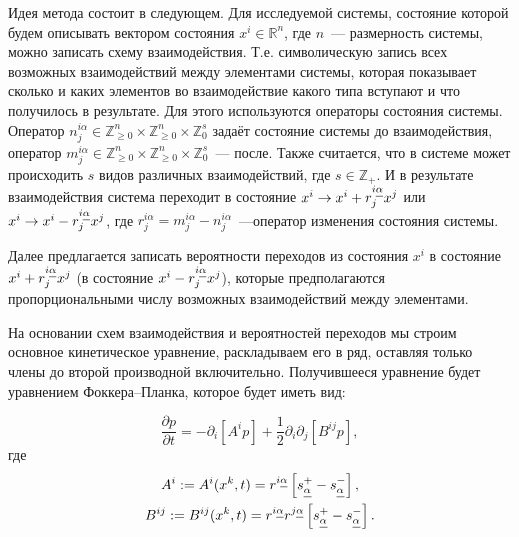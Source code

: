 \documentclass[floatfix,
showkeys,
twocolumn, nofootinbib, superscriptaddress, ]{revtex4-1}
\newcommand{\setR}{\mathbb{R}}
\newcommand{\setZ}{\mathbb{Z}}
\newcommand{\crd}[1]{\underline{\vphantom{j}{#1}}}
\begin{document}
  Идея метода состоит в следующем. Для исследуемой системы, состояние
  которой будем описывать вектором состояния $x^{i} \in \setR^n$, где
  $n$~--- размерность системы, можно записать схему
  взаимодействия. Т.е. символическую запись всех возможных
  взаимодействий между элементами системы, которая показывает сколько
  и каких элементов во взаимодействие какого типа вступают и что
  получилось в результате. Для этого используются операторы состояния
  системы. Оператор $n^{i \alpha}_{j} \in \setZ^{n}_{{}\geqslant 0}
  \times \setZ^{n}_{{}\geqslant 0} \times \setZ^{s}_{0}$ задаёт
  состояние системы до взаимодействия, оператор $m^{i \alpha}_{j} \in
  \setZ^{n}_{{}\geqslant 0} \times \setZ^{n}_{{}\geqslant 0} \times
  \setZ^{s}_{0}$~--- после. Также считается, что в системе может
  происходить $s$ видов различных взаимодействий, где $s\in
  \setZ_{+}$. И в результате взаимодействия система переходит в
  состояние $x^{i} \rightarrow x^i + r^{i \crd{\alpha}}_{j} x^{j}$ или
  $x^{i} \rightarrow x^{i} - r^{i \crd{\alpha}}_{j} x^{j}$, где
  $r_j^{i \alpha} = m_j^{i \alpha} -n_j^{i \alpha}$~---оператор
  изменения состояния системы.


  Далее предлагается записать вероятности переходов из состояния
  $x^{i}$ в состояние $x^{i} + r^{i \crd{\alpha}}_{j} x^{j}$ (в
  состояние $x^{i} - r^{i \crd{\alpha}}_{j} x^{j}$), которые
  предполагаются пропорциональными числу возможных взаимодействий
  между элементами.




  На основании схем взаимодействия и вероятностей переходов мы строим
  основное кинетическое уравнение, раскладываем его в ряд, оставляя
  только члены до второй производной включительно. Получившееся
  уравнение будет уравнением Фоккера--Планка, которое будет иметь вид:


\begin{equation}
  \label{eq:FP}
  \frac{\partial p}{\partial t} = -
  \partial_{i} \left[ A^{i} p \right] + \frac{1}{2} \partial_{i} \partial_{j} \left[
    B^{i j}p \right],
\end{equation}
  где
\begin{equation}
  \label{eq:kFP}
  \begin{gathered}
    A^{i} := A^{i}(x^{k}, t) = r^{i \crd{\alpha}} \left[ s^+_{\crd{\alpha}} - s^-_{\crd{\alpha}} \right], \\
    B^{i j} := B^{i j}(x^{k},t) = r^{i \crd{\alpha}} r^{j
      \crd{\alpha}} \left[ s^+_{\crd{\alpha}} - s^-_{\crd{\alpha}}
    \right].
  \end{gathered}
\end{equation}
\end{document}
